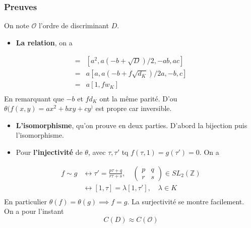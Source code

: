 \documentclass[12pt]{article}
\theoremstyle{plain}
\newcommand{\Z}{\mathbb{Z}}
\newcommand{\Or}{\mathcal{O}}
\newcommand{\gr}{\color{Sepia}}
\begin{document}
\subsubsection{Preuves} 
On note $\Or$ l'ordre de discriminant $D$.
\begin{itemize}
    \item \textbf{\gr La relation}, on a 
\end{itemize}
\begin{align*}
     [a, (-b+\sqrt{D})/2][a, (-b-\sqrt{D})/2] = &[a^2, a(-b+\sqrt{D})/2, -ab, ac]\\
                                              = &a[a,a(-b+f\sqrt{d_K})/2a, -b, c]\\
                                              = &a[1,fw_K]\\
\end{align*}
En remarquant que  $-b$ et $fd_K$ ont la même parité. D'ou $\theta(f(x,y)=ax^2+bxy+cy^)$ est propre car inversible.
\begin{itemize}
    \item \textbf{\gr L'isomorphisme}, qu'on prouve en deux parties. D'abord la bijection puis l'isomorphisme.
    \item Pour \textbf{\gr l'injectivité} de $\theta$, avec $\tau,\tau'$ tq
    $f(\tau,1)=g(\tau')=0$. On a

\end{itemize}
\begin{align*}
    f\sim g&\leftrightarrow \tau'=\frac{p\tau+q}{r\tau+s},\quad\begin{pmatrix}
        p & q\\
        r & s
    \end{pmatrix}\in SL_2(\Z)\\
    &\leftrightarrow [1,\tau]=\lambda[1,\tau'],\quad \lambda\in K\\
\end{align*}
En particulier $\theta(f)=\theta(g)\implies f=g$. La surjectivité se montre facilement.\\
On a pour l'instant $$C(D)\approx C(\Or)$$
\end{document}
